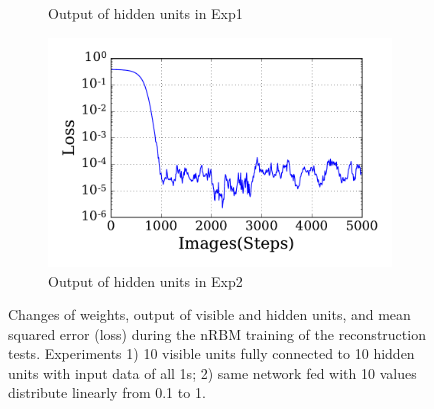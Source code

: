 \begin{figure}
\begin{subfigure}[t]{0.45\textwidth}
		\caption{Output of hidden units in Exp1}
	\end{subfigure}
	\begin{subfigure}[t]{0.45\textwidth}
		\includegraphics[width=\textwidth]{pics_sdlm/30_exp_RBM/exp2_loss.pdf}
		\caption{Output of hidden units in Exp2}
	\end{subfigure}
	\caption{Changes of weights, output of visible and hidden units, and mean squared error (loss) during the nRBM training of the reconstruction tests. 
		Experiments 1) 10 visible units fully connected to 10 hidden units with input data of all 1s; 2) same network fed with 10 values distribute linearly from 0.1 to 1.}
	\label{fig:rbm_orig}
\end{figure}

